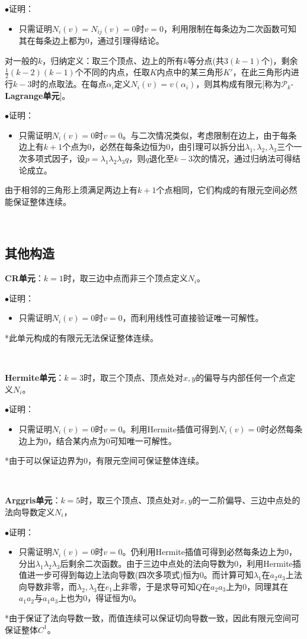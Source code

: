 \documentclass[a4paper,UTF8,fontset=windows]{ctexart}
\newcommand*{\cp}{\mathcal{P}}
\newcommand{\proo}[1]{{\kaishu $\bullet$证明：
\begin{itemize}
    \item[] #1
\end{itemize}
}}
\begin{document}
\proo{
    只需证明$N_i(v)=N_{ij}(v)=0$时$v=0$，利用限制在每条边为二次函数可知其在每条边上都为0，通过引理得结论。
}

对一般的$k$，归纳定义：取三个顶点、边上的所有$k$等分点(共$3(k-1)$个)，剩余$\frac{1}{2}(k-2)(k-1)$个不同的内点，任取$K$内点中的某三角形$K'$，在此三角形内进行$k-3$时的点取法。在每点$\alpha_i$定义$N_i(v)=v(\alpha_i)$，则其构成有限元[称为$\cp_k$-\textbf{Lagrange单元}]。

\proo{
    只需证明$N_i(v)=0$时$v=0$。与二次情况类似，考虑限制在边上，由于每条边上有$k+1$个点为0，必然在每条边恒为0，由引理可以拆分出$\lambda_1,\lambda_2,\lambda_3$三个一次多项式因子，设$p=\lambda_1\lambda_2\lambda_3q$，则$q$退化至$k-3$次的情况，通过归纳法可得结论成立。
}

由于相邻的三角形上须满足两边上有$k+1$个点相同，它们构成的有限元空间必然能保证整体连续。

\

\subsection{其他构造}

\textbf{CR单元}：$k=1$时，取三边中点而非三个顶点定义$N_i$。

\proo{
    只需证明$N_i(v)=0$时$v=0$，而利用线性可直接验证唯一可解性。
}

*此单元构成的有限元无法保证整体连续。

\

\textbf{Hermite单元}：$k=3$时，取三个顶点、顶点处对$x,y$的偏导与内部任何一个点定义$N_i$。

\proo{
    只需证明$N_i(v)=0$时$v=0$。利用Hermite插值可得到$N_i(v)=0$时必然每条边上为0，结合某内点为0可知唯一可解性。
}

*由于可以保证边界为0，有限元空间可保证整体连续。

\

\textbf{Arggris单元}：$k=5$时，取三个顶点、顶点处对$x,y$的一二阶偏导、三边中点处的法向导数定义$N_i$，

\proo{
    只需证明$N_i(v)=0$时$v=0$。仍利用Hermite插值可得到必然每条边上为0，分出$\lambda_1\lambda_2\lambda_3$后剩余二次函数。由于三边中点处的法向导数为0，利用Hermite插值进一步可得到每边上法向导数(四次多项式)恒为0。而计算可知$\lambda_1$在$a_2a_3$上法向导数非零，而$\lambda_2,\lambda_3$在$e_1$上非零，于是求导可知$Q$在$a_2a_3$上为0，同理其在$a_1a_2$与$a_1a_3$上也为0，得证恒为0。
}

*由于保证了法向导数一致，而值连续可以保证切向导数一致，因此有限元空间可保证整体$C^1$。
\end{document}
